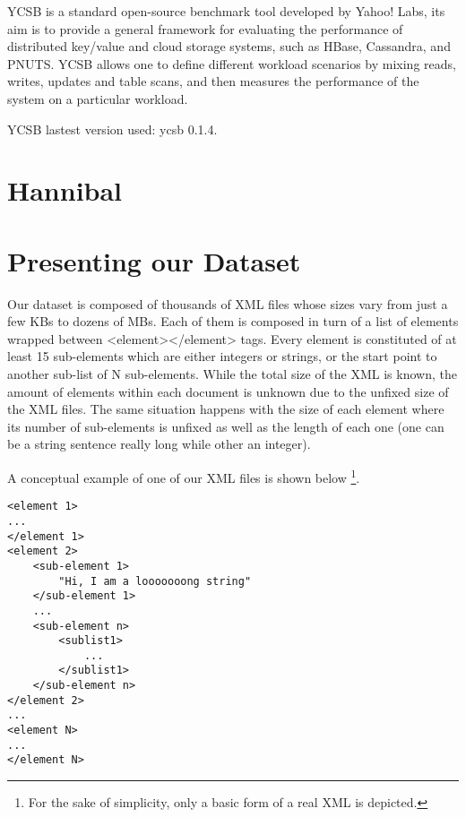 YCSB\cite{cooper2010benchmarking} is a standard open-source benchmark tool developed by Yahoo! Labs, its aim is to provide a general framework for evaluating the performance of distributed key/value and cloud storage systems, such as HBase, Cassandra, and PNUTS. YCSB allows one to define different workload scenarios by mixing reads, writes, updates and table scans, and then measures the performance of the system on a particular workload.
\par
{}
\par
YCSB lastest version \cite{YCSB} used: ycsb 0.1.4.

\section{Hannibal}




\section{Presenting our Dataset}

Our dataset is composed of thousands of XML files whose sizes vary from just a few KBs to dozens of MBs. Each of them is composed in turn of a list of elements wrapped between <element></element> tags. Every element is constituted of at least 15 sub-elements which are either integers or strings, or the start point to another sub-list of N sub-elements. While the total size of the XML is known, the amount of elements within each document is unknown due to the unfixed size of the XML files. The same situation happens with the size of each element where its number of sub-elements is unfixed as well as the length of each one (one can be a string sentence really long while other an integer).
\par
A conceptual example of one of our XML files is shown below \footnote{For the sake of simplicity, only a basic form of a real XML is depicted.}.

\lstset{language=XML, basicstyle=\footnotesize, numbers=left, breaklines=true}
\begin{lstlisting}
<element 1>
...
</element 1>
<element 2>
	<sub-element 1>
		"Hi, I am a looooooong string"
	</sub-element 1>
	...
	<sub-element n>
		<sublist1>
			...
		</sublist1>
	</sub-element n>
</element 2>
...
<element N>
...
</element N>
\end{lstlisting}


